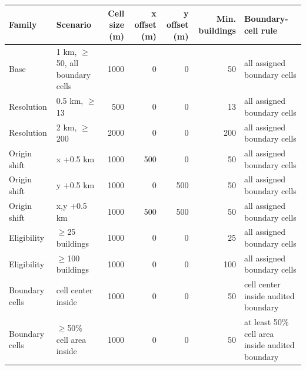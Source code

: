 \begin{tabular}{@{}llrrrrp{3.6cm}@{}}
\toprule
Family & Scenario & Cell size (m) & x offset (m) & y offset (m) & Min. buildings & Boundary-cell rule \\
\midrule
Base & 1 km, $\geq$50, all boundary cells & 1000 & 0 & 0 & 50 & all assigned boundary cells \\
Resolution & 0.5 km, $\geq$13 & 500 & 0 & 0 & 13 & all assigned boundary cells \\
Resolution & 2 km, $\geq$200 & 2000 & 0 & 0 & 200 & all assigned boundary cells \\
Origin shift & x +0.5 km & 1000 & 500 & 0 & 50 & all assigned boundary cells \\
Origin shift & y +0.5 km & 1000 & 0 & 500 & 50 & all assigned boundary cells \\
Origin shift & x,y +0.5 km & 1000 & 500 & 500 & 50 & all assigned boundary cells \\
Eligibility & $\geq$25 buildings & 1000 & 0 & 0 & 25 & all assigned boundary cells \\
Eligibility & $\geq$100 buildings & 1000 & 0 & 0 & 100 & all assigned boundary cells \\
Boundary cells & cell center inside & 1000 & 0 & 0 & 50 & cell center inside audited boundary \\
Boundary cells & $\geq$50\% cell area inside & 1000 & 0 & 0 & 50 & at least 50\% cell area inside audited boundary \\
\bottomrule
\end{tabular}
